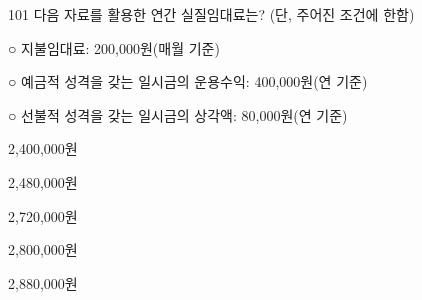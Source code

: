 \begin{question}{101}
다음 자료를 활용한 연간 실질임대료는? (단, 주어진 조건에 한함)
\begin{framedtext}
○ 지불임대료: 200,000원(매월 기준) \par
○ 예금적 성격을 갖는 일시금의 운용수익: 400,000원(연 기준) \par
○ 선불적 성격을 갖는 일시금의 상각액: 80,000원(연 기준) \par
\end{framedtext}
\begin{choices}
  \item 2,400,000원
  \item 2,480,000원
  \item 2,720,000원
  \item 2,800,000원
  \item 2,880,000원
\end{choices}
\end{question}
